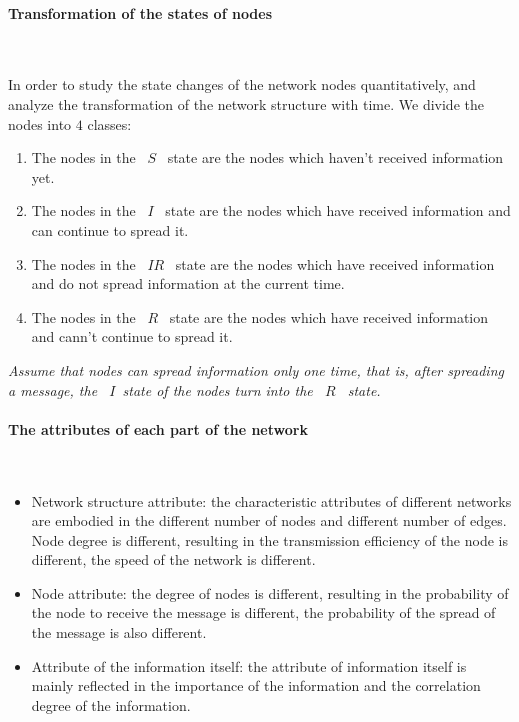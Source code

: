 \documentclass[a4paper,11pt]{article}
\begin{document}
\paragraph{Transformation of the states of nodes}
\textrm{\\}
\par In order to study the state changes of the network nodes quantitatively, and analyze the transformation of the network structure with time. We divide the nodes into $4$ classes:

\begin{enumerate}%
\renewcommand{\labelenumi}{(\theenumi)}
    \item The nodes in the ~$S$~ state are the nodes which haven't received information yet.
    
    \item The nodes in the ~$I$~ state are the nodes which have received information and can continue to spread it.
    \item The nodes in the ~$IR$~ state are the nodes which have received information and do not spread information at the current time.
    \item The nodes in the ~$R$~ state are the nodes which have received information and cann't continue to spread it.
\end{enumerate}
\emph{Assume that nodes can spread information only one time, that is, after spreading a message, the ~$I$~state of the nodes turn into the ~$R$~ state.
}


\paragraph{The attributes of each part of the network}
\textrm{\\}

\begin{itemize}
\item Network structure attribute: the characteristic attributes of different networks are embodied in the different number of nodes and different number of edges. Node degree is different, resulting in the transmission efficiency of the node is different, the speed of the network is different.
\item Node attribute: the degree of nodes is different, resulting in the probability of the node to receive the message is different, the probability of the spread of the message is also different.
\item Attribute of the information itself: the attribute of information itself is mainly reflected in the importance of the information and the correlation degree of the information.
\end{itemize}
\end{document}
